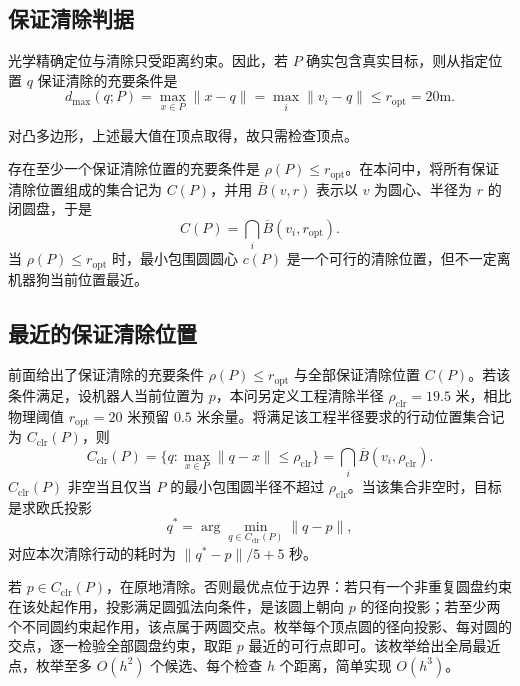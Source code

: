 \documentclass[UTF8,a4paper,zihao=-4,fontset=none]{ctexart}
\begin{document}
\subsection{保证清除判据}

光学精确定位与清除只受距离约束。因此，若 \(P\) 确实包含真实目标，则从指定位置 \(q\) 保证清除的充要条件是
\begin{equation}
  d_{\max}(q;P)=\max_{x\in P}\lVert x-q\rVert=\max_i\lVert v_i-q\rVert\le r_{\mathrm{opt}} =20\mathrm{m}.
  \label{eq:clear-condition}
\end{equation}

对凸多边形，上述最大值在顶点取得，故只需检查顶点。

存在至少一个保证清除位置的充要条件是 \(\rho(P)\le r_{\mathrm{opt}}\)。在本问中，将所有保证清除位置组成的集合记为 \(C(P)\)，并用 \(\overline B(v,r)\) 表示以 \(v\) 为圆心、半径为 \(r\) 的闭圆盘，于是
\begin{equation}
  C(P)=\bigcap_i\overline{B}(v_i,r_{\mathrm{opt}}).
  \label{eq:clear-set}
\end{equation}
当 \(\rho(P)\le r_{\mathrm{opt}}\) 时，最小包围圆圆心 \(c(P)\) 是一个可行的清除位置，但不一定离机器狗当前位置最近。

\subsection{最近的保证清除位置}

前面给出了保证清除的充要条件 \(\rho(P)\le r_{\mathrm{opt}}\) 与全部保证清除位置 \(C(P)\)。若该条件满足，设机器人当前位置为 \(p\)，本问另定义工程清除半径 \(\rho_{\mathrm{clr}}=19.5\) 米，相比物理阈值 \(r_{\mathrm{opt}}=20\) 米预留 \(0.5\) 米余量。将满足该工程半径要求的行动位置集合记为 \(C_{\mathrm{clr}}(P)\)，则
\begin{equation}
  C_{\mathrm{clr}}(P)=\{q:\max_{x\in P}\lVert q-x\rVert\le\rho_{\mathrm{clr}}\}
  =\bigcap_{i}\overline{B}(v_i,\rho_{\mathrm{clr}}).
  \label{eq:clear-proj}
\end{equation}
\(C_{\mathrm{clr}}(P)\) 非空当且仅当 \(P\) 的最小包围圆半径不超过 \(\rho_{\mathrm{clr}}\)。当该集合非空时，目标是求欧氏投影
\begin{equation}
  q^*=\arg\min_{q\in C_{\mathrm{clr}}(P)}\lVert q-p\rVert ,
\end{equation}
对应本次清除行动的耗时为 \(\lVert q^*-p\rVert/5+5\) 秒。

若 \(p\in C_{\mathrm{clr}}(P)\)，在原地清除。否则最优点位于边界：若只有一个非重复圆盘约束在该处起作用，投影满足圆弧法向条件，是该圆上朝向 \(p\) 的径向投影；若至少两个不同圆约束起作用，该点属于两圆交点。枚举每个顶点圆的径向投影、每对圆的交点，逐一检验全部圆盘约束，取距 \(p\) 最近的可行点即可。该枚举给出全局最近点，枚举至多 \(O(h^2)\) 个候选、每个检查 \(h\) 个距离，简单实现 \(O(h^3)\)。
\end{document}
